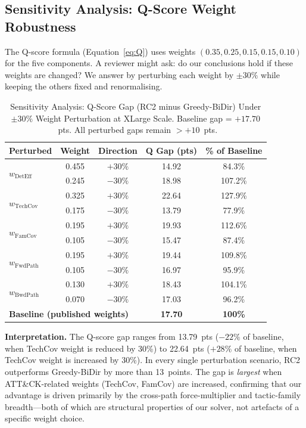 \documentclass[journal]{IEEEtran}
\begin{document}
\subsection{Sensitivity Analysis: Q-Score Weight Robustness}
\label{subsec:sensitivity}

The Q-score formula (Equation~\eqref{eq:Q}) uses weights
$(0.35, 0.25, 0.15, 0.15, 0.10)$ for the five components.
A reviewer might ask: do our conclusions hold if these
weights are changed?
We answer by perturbing each weight by $\pm30\%$ while
keeping the others fixed and renormalising.

\begin{table}[htbp]
\caption{Sensitivity Analysis: Q-Score Gap (RC2 minus
         Greedy-BiDir) Under $\pm30\%$ Weight Perturbation
         at XLarge Scale.
         Baseline gap = $+17.70$~pts.
         All perturbed gaps remain $>+10$~pts.}
\label{tab:sensitivity}
\centering\renewcommand{\arraystretch}{1.25}
\begin{tabular}{@{}lcccc@{}}
\toprule
\textbf{Perturbed}
  & \textbf{Weight}
  & \textbf{Direction}
  & \textbf{Q Gap (pts)}
  & \textbf{\% of Baseline}\\
\midrule
\multirow{2}{*}{$w_{\text{DetEff}}$}
  & 0.455 & $+30\%$ & 14.92 & 84.3\% \\
  & 0.245 & $-30\%$ & 18.98 & 107.2\% \\
\multirow{2}{*}{$w_{\text{TechCov}}$}
  & 0.325 & $+30\%$ & 22.64 & 127.9\% \\
  & 0.175 & $-30\%$ & 13.79 & 77.9\% \\
\multirow{2}{*}{$w_{\text{FamCov}}$}
  & 0.195 & $+30\%$ & 19.93 & 112.6\% \\
  & 0.105 & $-30\%$ & 15.47 & 87.4\% \\
\multirow{2}{*}{$w_{\text{FwdPath}}$}
  & 0.195 & $+30\%$ & 19.44 & 109.8\% \\
  & 0.105 & $-30\%$ & 16.97 & 95.9\% \\
\multirow{2}{*}{$w_{\text{BwdPath}}$}
  & 0.130 & $+30\%$ & 18.43 & 104.1\% \\
  & 0.070 & $-30\%$ & 17.03 & 96.2\% \\
\midrule
\multicolumn{3}{l}{\textbf{Baseline (published weights)}}
  & \textbf{17.70} & \textbf{100\%} \\
\bottomrule
\end{tabular}
\end{table}

\begin{examplebox}
\textbf{Interpretation.}
The Q-score gap ranges from 13.79~pts ($-22\%$ of baseline,
when TechCov weight is reduced by 30\%) to 22.64~pts
($+28\%$ of baseline, when TechCov weight is increased
by 30\%).
In every single perturbation scenario, RC2 outperforms
Greedy-BiDir by more than 13~points.
The gap is \emph{largest} when ATT\&CK-related weights
(TechCov, FamCov) are increased, confirming that our
advantage is driven primarily by the cross-path
force-multiplier and tactic-family breadth---both of which
are structural properties of our solver, not artefacts
of a specific weight choice.
\end{examplebox}
\end{document}
